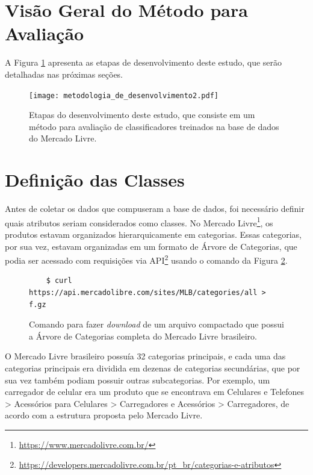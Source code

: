 \section{Visão Geral do Método para Avaliação}

A Figura \ref{fig:etapas_desenvolvimento} apresenta as etapas de desenvolvimento deste estudo, que serão detalhadas nas próximas seções.

\begin{figure}[!ht]
    \centering
	\texttt{[image: metodologia\_de\_desenvolvimento2.pdf]}
	\caption{Etapas do desenvolvimento deste estudo, que consiste em um método para avaliação de classificadores treinados na base de dados do Mercado Livre.}
	\label{fig:etapas_desenvolvimento}
\end{figure}

\section{Definição das Classes}
\label{definicao_classes}
Antes de coletar os dados que compuseram a base de dados, foi necessário definir quais atributos seriam considerados como classes. No Mercado Livre\footnote{\url{https://www.mercadolivre.com.br/}}, os produtos estavam organizados hierarquicamente em categorias. Essas categorias, por sua vez, estavam organizadas em um formato de Árvore de Categorias, que podia ser acessado com requisições via API\footnote{\url{https://developers.mercadolivre.com.br/pt_br/categorias-e-atributos}} usando o comando da Figura \ref{fig:comando_category_tree}.

\begin{figure}[htb]
    \centering
    \color{black}
    \begin{verbatim}
    $ curl https://api.mercadolibre.com/sites/MLB/categories/all > f.gz
    \end{verbatim}
    \caption{Comando para fazer \textit{download} de um arquivo compactado que possui a Árvore de Categorias completa do Mercado Livre brasileiro.}
    \label{fig:comando_category_tree}
\end{figure}

O Mercado Livre brasileiro possuía 32 categorias principais, e cada uma das categorias principais era dividida em dezenas de categorias secundárias, que por sua vez também podiam possuir outras subcategorias. Por exemplo, um carregador de celular era um produto que se encontrava em Celulares e Telefones > Acessórios para Celulares > Carregadores e Acessórios > Carregadores, de acordo com a estrutura proposta pelo Mercado Livre.

